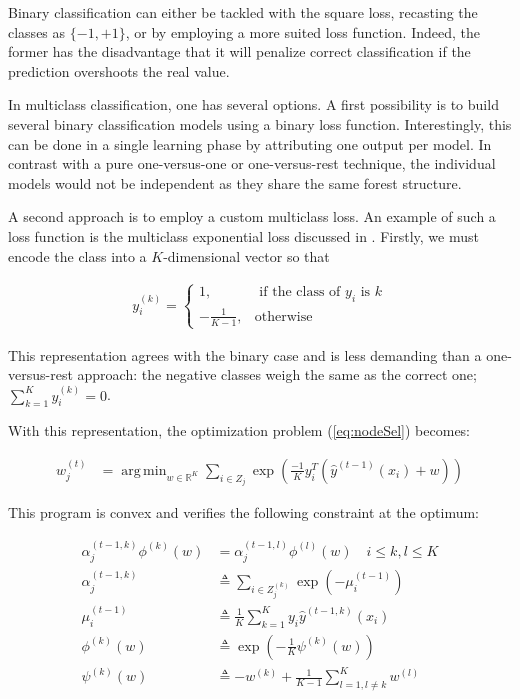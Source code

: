 \documentclass{article}
\DeclareMathOperator*{\argmin}{arg\,min}
\begin{document}
Binary classification can either be tackled with the square loss, recasting the 
classes as $\{-1, +1\}$, or by employing a more suited loss function. Indeed, 
the former has the disadvantage that it will penalize correct classification if 
the prediction overshoots the real value.

In multiclass classification, one has several options. A first possibility is 
to build several binary classification models using a binary loss function. 
Interestingly, this can be done in a single learning phase by attributing one 
output per model. In contrast with a pure one-versus-one or one-versus-rest 
technique, the individual models would not be independent as they share the 
same forest structure.

A second approach is to employ a custom multiclass loss. An example of such a 
loss function is the multiclass exponential loss discussed in 
\cite{zhu2009multiadaboost}. Firstly, we must encode the class into a 
$K$-dimensional vector so that

\vspace*{-\baselineskip}
\begin{align}\label{eq:MEencode}
y_i^{(k)} = \begin{cases}
1, &\text{ if the class of } y_i \text{ is } k \\
-\frac{1}{K-1}, &\text{otherwise}
\end{cases}
\end{align}
\vspace*{-\baselineskip}

This representation agrees with the binary case and is less demanding than a 
one-versus-rest approach: the negative classes weigh the same as the correct 
one; $\sum_{k=1}^{K} y_i^{(k)} = 0$.

With this representation, the optimization problem (\ref{eq:nodeSel}) becomes:

\vspace*{-\baselineskip}
\begin{align}\label{eq:MEmin}
w_j^{(t)} &=  \argmin_{w \in \mathbb{R}^K} \sum_{i \in Z_j} \exp 
\left(\frac{-1}{K} y_i^T \left(\hat{y}^{(t-1)}(x_i) + w \right)\right)
\end{align}
\vspace*{-\baselineskip}

This program is convex and verifies the following constraint at the optimum:

\vspace*{-\baselineskip}
\begin{align}\label{eq:MEequation}
\alpha_j^{(t-1, k)}\phi^{(k)}(w) &= \alpha_j^{(t-1, l)}\phi^{(l)}(w) \quad i 
\leq k,l \leq K \\
\alpha_j^{(t-1, k)} &\triangleq \sum_{i \in Z_j^{(k)}} \exp \left( - 
\mu_i^{(t-1)} \right) \\
\mu_i^{(t-1)} &\triangleq \frac{1}{K} \sum_{k=1}^{K} y_i \hat{y}^{(t-1, 
k)}(x_i) \\
\phi^{(k)}(w) &\triangleq \exp \left( - \frac{1}{K} \psi^{(k)}(w) \right) \\
\psi^{(k)}(w) &\triangleq -w^{(k)} + \frac{1}{K-1} \sum_{l=1, l\neq k}^{K}  
w^{(l)}
\end{align}
\vspace*{-\baselineskip}
\end{document}
